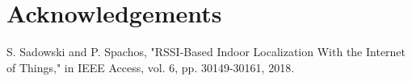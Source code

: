\documentclass[letterpaper, 10 pt, conference]{ieeeconf}  %
\begin{document}
\section{Acknowledgements}


\addtolength{\textheight}{-10cm}   %


\newpage
\begin{thebibliography}{99}

 S. Sadowski and P. Spachos, "RSSI-Based Indoor Localization With the Internet of Things," in IEEE Access, vol. 6, pp. 30149-30161, 2018.

\end{thebibliography}
\end{document}
